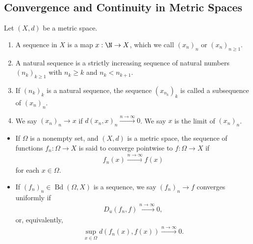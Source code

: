\subsection{Convergence and Continuity in Metric Spaces}%
\begin{definition}
  Let $\left(X,d\right)$ be a metric space.
  \begin{enumerate}[(1)]
    \item A sequence in $X$ is a map $x: \N\rightarrow X$, which we call $\left(x_{n}\right)_{n}$ or $\left(x_{n}\right)_{n\geq 1}$.
    \item A natural sequence is a strictly increasing sequence of natural numbers $\left(n_{k}\right)_{k\geq 1}$ with $n_{k}\geq k$ and $n_{k} < n_{k+1}$.
    \item If $\left(n_k\right)_{k}$ is a natural sequence, the sequence $\left(x_{n_k}\right)_{k}$ is called a subsequence of $\left(x_{n}\right)_n$.
    \item We say $\left(x_n\right)_n\rightarrow x$ if $d\left(x_n,x\right)_{n} \xrightarrow{n\rightarrow\infty} 0$. We say $x$ is the limit of $\left(x_n\right)_n$.
  \end{enumerate}
\end{definition}
\begin{example}
  \begin{itemize}
    \item If $\Omega$ is a nonempty set, and $\left(X,d\right)$ is a metric space, the sequence of functions $f_n: \Omega\rightarrow X$ is said to converge pointwise to $f: \Omega\rightarrow X$ if
      \begin{align*}
        f_n\left(x\right)\xrightarrow{n\rightarrow\infty}f(x)
      \end{align*}
      for each $x\in \Omega$.
    \item If $\left(f_n\right)_n\in \operatorname{Bd}\left(\Omega,X\right)$ is a sequence, we say $\left(f_n\right)_n\rightarrow f$ converges uniformly if
      \begin{align*}
        D_u\left(f_n,f\right)\xrightarrow{n\rightarrow\infty}0,
      \end{align*}
      or, equivalently,
      \begin{align*}
        \sup_{x\in\Omega}d\left(f_n(x),f(x)\right)\xrightarrow{n\rightarrow\infty}0.
      \end{align*}
  \end{itemize}
\end{example}
